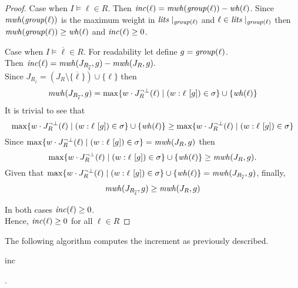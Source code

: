 \begin{proof}
    Case when $I \models \ell \in R$.
    Then $\mathit{inc}(\ell) = \mathit{mwh}(\mathit{group}(\ell))-\mathit{wh}(\ell)$. Since $\mathit{mwh}(\mathit{group}(\ell))$ is the  
    maximum weight in $\mathit{lits} \mid_{\mathit{group}(\ell)}$ and $\ell \in \mathit{lits} \mid_{\mathit{group}(\ell)}$ then 
    $\mathit{mwh}(\mathit{group}(\ell)) \ge \mathit{wh}(\ell)$ and $\mathit{inc}(\ell) \ge 0$.

    Case when $I \models \overline{\ell} \in R$.
    For readability let define $g = \mathit{group}(\ell)$.\\
    Then $\mathit{inc}(\ell) = \mathit{mwh}(J_{R_{\overline{\ell}}},g) - \mathit{mwh}(J_R,g).$\\
    Since $J_{R_{\overline{\ell}}} = (J_R \setminus \{\overline{\ell}\}) \cup \{\ell\}$ then 
    $$\mathit{mwh}(J_{R_{\overline{\ell}}},g) = 
    \max\{w \cdot J_R^{\neg\bot}(\ell) \mid (w : \ell\ [g]) \in \sigma\} \cup \{\mathit{wh}(\ell)\}$$
    It is trivial to see that 
    $$\max\{w \cdot J_R^{\neg\bot}(\ell) \mid (w : \ell\ [g]) \in \sigma\} \cup \{\mathit{wh}(\ell)\}
    \ge \max\{w \cdot J_R^{\neg\bot}(\ell) \mid (w : \ell\ [g]) \in \sigma\}$$
    Since $\max\{w \cdot J_R^{\neg\bot}(\ell) \mid (w : \ell\ [g]) \in \sigma\} = \mathit{mwh}(J_R,g)$
    then $$\max\{w \cdot J_R^{\neg\bot}(\ell) \mid (w : \ell\ [g]) \in \sigma\} \cup \{\mathit{wh}(\ell)\}
    \ge \mathit{mwh}(J_R, g).$$
    Given that  $\max\{w \cdot J_R^{\neg\bot}(\ell) \mid (w : \ell\ [g]) \in \sigma\} \cup \{\wh(\ell)\} = 
    \mathit{mwh}(J_{R_{\overline{\ell}}},g)$, finally, 
    $$\mathit{mwh}(J_{R_{\overline{\ell}}},g) \ge \mathit{mwh}(J_R, g)$$

    In both cases $\mathit{inc}(\ell) \ge 0$.\\ Hence, $\mathit{inc}(\ell) \ge 0$ for all $\ell \in R$
\end{proof}

The following algorithm computes the increment as previously described.
\begin{algorithm}[h]\small
    \caption{inc}
        \label{alg:increment}
        .
\end{algorithm}

